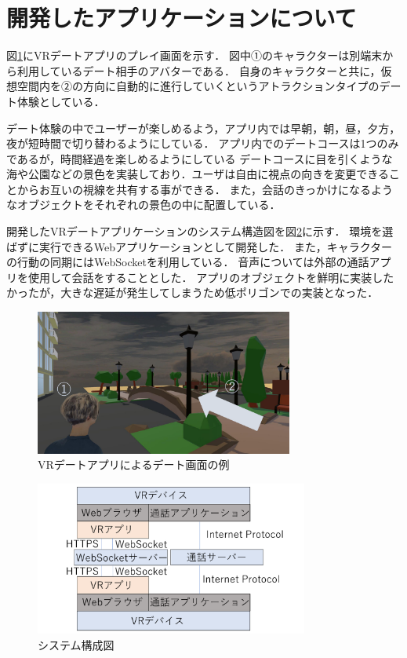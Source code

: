 \documentclass[twocolumn,10pt,a4j]{ltjsarticle}
\begin{document}
\section{開発したアプリケーションについて}
図\ref{fig:screen}にVRデートアプリのプレイ画面を示す．
図中①のキャラクターは別端末から利用しているデート相手のアバターである．
自身のキャラクターと共に，仮想空間内を②の方向に自動的に進行していくというアトラクションタイプのデート体験としている．

デート体験の中でユーザーが楽しめるよう，アプリ内では早朝，朝，昼，夕方，夜が短時間で切り替わるようにしている．
アプリ内でのデートコースは1つのみであるが，時間経過を楽しめるようにしている
デートコースに目を引くような海や公園などの景色を実装しており．ユーザは自由に視点の向きを変更できることからお互いの視線を共有する事ができる．
また，会話のきっかけになるようなオブジェクトをそれぞれの景色の中に配置している．

開発したVRデートアプリケーションのシステム構造図を図\ref{fig:system}に示す．
環境を選ばずに実行できるWebアプリケーションとして開発した．
また，キャラクターの行動の同期にはWebSocketを利用している．
音声については外部の通話アプリを使用して会話をすることとした．
アプリのオブジェクトを鮮明に実装したかったが，大きな遅延が発生してしまうため低ポリゴンでの実装となった．


\begin{figure}[h]
\begin{center}
\includegraphics[width=85mm]{apurinai.pdf}
\end{center}
 \caption{VRデートアプリによるデート画面の例}
 \label{fig:screen}
\end{figure}

\begin{figure}[h]
\begin{center}
\includegraphics[width=90mm]{systemkouzou.pdf}
\end{center}
 \caption{システム構成図}
 \label{fig:system}
\end{figure}
\end{document}
